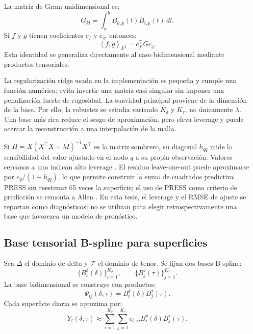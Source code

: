 \documentclass[a4paper,11pt]{article}
\newcommand{\inner}[2]{\left\langle #1,#2 \right\rangle}
\begin{document}
La matriz de Gram unidimensional es:
\[
  G_{kl}=\int_a^b B_{k,p}(t)B_{l,p}(t)\,dt.
\]
Si \(f\) y \(g\) tienen coeficientes \(c_f\) y \(c_g\), entonces:
\[
  \inner{f}{g}_{L^2}=c_f^\top G c_g.
\]
Esta identidad se generaliza directamente al caso bidimensional mediante productos tensoriales.

La regularización ridge usada en la implementación es pequeña y cumple una función numérica: evita invertir una matriz casi singular sin imponer una penalización fuerte de rugosidad. La suavidad principal proviene de la dimensión de la base. Por ello, la robustez se estudia variando \(K_\delta\) y \(K_\tau\), no únicamente \(\lambda\). Una base más rica reduce el sesgo de aproximación, pero eleva leverage y puede acercar la reconstrucción a una interpolación de la malla.

Si \(H=X(X^\top X+\lambda I)^{-1}X^\top\) es la matriz sombrero, su diagonal \(h_{qq}\) mide la sensibilidad del valor ajustado en el nodo \(q\) a su propia observación. Valores cercanos a uno indican alto leverage \cite{HoaglinWelsch1978}. El residuo leave-one-out puede aproximarse por \(e_q/(1-h_{qq})\), lo que permite construir la suma de cuadrados predictiva PRESS sin reestimar 65 veces la superficie; el uso de PRESS como criterio de predicción se remonta a Allen \cite{Allen1974}. En esta tesis, el leverage y el RMSE de ajuste se reportan como diagnósticos; no se utilizan para elegir retrospectivamente una base que favorezca un modelo de pronóstico.

\subsection{Base tensorial B-spline para superficies}

Sea \(\Delta\) el dominio de delta y \(\mathcal{T}\) el dominio de tenor. Se fijan dos bases B-spline:
\[
  \{B_i^\delta(\delta)\}_{i=1}^{K_\delta},
  \qquad
  \{B_j^\tau(\tau)\}_{j=1}^{K_\tau}.
\]
La base bidimensional se construye con productos:
\[
  \Psi_{ij}(\delta,\tau)=B_i^\delta(\delta)B_j^\tau(\tau).
\]
Cada superficie diaria se aproxima por:
\[
  Y_t(\delta,\tau)
  \approx
  \sum_{i=1}^{K_\delta}\sum_{j=1}^{K_\tau}
  c_{t,ij}B_i^\delta(\delta)B_j^\tau(\tau).
\]
\end{document}
